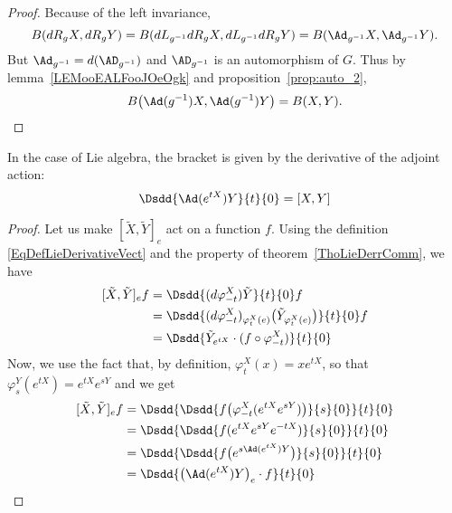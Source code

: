 \begin{proof}
	Because of the left invariance,
	\[
		B(dR_gX,dR_gY)=B(dL_{g^{-1}}dR_gX,dL_{g^{-1}}dR_gY)=B(\Ad_{g^{-1}}X,\Ad_{g^{-1}}Y).
	\]
	But $\Ad_{g^{-1}}=d(\AD_{g^{-1}})$ and $\AD_{g^{-1}}$ is an automorphism of $G$. Thus by lemma~\ref{LEMooEALFooJOeOgk} and proposition~\ref{prop:auto_2},
	\begin{equation}                    \label{eq_KillAdinvariant}
		B\big(\Ad(g^{-1})X,\Ad(g^{-1})Y\big)=B(X,Y).
	\end{equation}
\end{proof}

\begin{lemma}
	In the case of Lie algebra, the bracket is given by the derivative of the adjoint action:
	\begin{equation}
		\Dsdd{ \Ad( e^{tX})Y }{t}{0}=[X,Y]
	\end{equation}
\end{lemma}

\begin{proof}
	Let us make $[\tilde X,\tilde Y]_e$ act on a function $f$. Using the definition \eqref{EqDefLieDerivativeVect} and the property of theorem~\ref{ThoLieDerrComm}, we have
	\begin{equation}
		\begin{aligned}[]
			[\tilde X,\tilde Y]_ef & =\Dsdd{ (d\varphi_{-t}^X)\tilde Y }{t}{0}f                                               \\
			                       & =\Dsdd{ (d\varphi_{-t}^X)_{\varphi_t^X(e)}\big( \tilde Y_{\varphi_t^X(e)} \big) }{t}{0}f \\
			                       & =\Dsdd{ \tilde Y_{ e^{tX}}\cdot(f\circ\varphi_{-t}^X) }{t}{0}
		\end{aligned}
	\end{equation}
	Now, we use the fact that, by definition, $\varphi_t^X(x)=x e^{tX}$, so that $\varphi_s^Y( e^{tX})= e^{tX} e^{sY}$ and we get
	\begin{equation}
		\begin{aligned}[]
			[\tilde X,\tilde Y]_ef & =\Dsdd{ \Dsdd{ f\big( \varphi_{-t}^X( e^{tX} e^{sY}) \big) }{s}{0} }{t}{0} \\
			                       & =\Dsdd { \Dsdd{ f( e^{tX} e^{sY} e^{-tX}) }{s}{0} } {t}{0}                 \\
			                       & =\Dsdd{ \Dsdd{ f\big(  e^{s\Ad( e^{tX})Y} \big) }{s}{0} }{t}{0}            \\
			                       & =\Dsdd{ \big( \Ad( e^{tX})Y \big)_e\cdot f }{t}{0}
		\end{aligned}
	\end{equation}

\end{proof}

